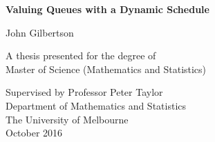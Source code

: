 \begin{titlepage}
    \begin{center}
        \vspace*{1cm}
        
        \Huge
        \textbf{Valuing Queues with a Dynamic Schedule}
        
        \vspace{0.5cm}
        
        \LARGE
        John Gilbertson
        
        \vfill
        
        A thesis presented for the degree of\\
        Master of Science (Mathematics and Statistics)
        
        \vspace{0.8cm}
        
        \Large
        Supervised by Professor Peter Taylor\\
        Department of Mathematics and Statistics\\
        The University of Melbourne\\
        October 2016
        
    \end{center}
\end{titlepage}














































